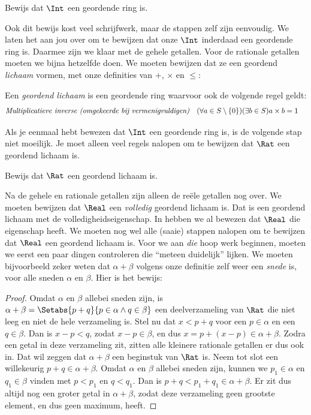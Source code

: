 \documentclass[../../../include/open-logic-section]{subfiles}
\begin{document}
\begin{prob}
Bewijs dat $\Int$ een geordende ring is. 
\end{prob}
Ook dit bewijs kost veel schrijfwerk, maar de stappen zelf zijn
eenvoudig. We laten het aan jou over om te bewijzen dat onze
$\Int$ inderdaad een geordende ring is.
Daarmee zijn we klaar met de gehele getallen. Voor de rationale getallen moeten we
bijna hetzelfde doen. We moeten bewijzen dat ze een geordend
\emph{lichaam} vormen, met onze definities van $+$, $\times$ en
$\leq$:
\begin{defn}
Een \emph{geordend lichaam} is een geordende ring waarvoor ook de volgende regel geldt:
\begin{align*}
	\emph{Multiplicatieve inverse (omgekeerde bij vermenigvuldigen)}& & (\forall a \in S \setminus \{0\})(\exists b \in S) a\times b& = 1
\end{align*}
\end{defn}
Als je eenmaal hebt bewezen dat $\Int$ een geordende ring is, is de
volgende stap niet moeilijk. Je moet alleen veel regels nalopen om
te bewijzen dat $\Rat$ een geordend lichaam is.
\begin{prob}
Bewijs dat $\Rat$ een geordend lichaam is.
\end{prob}
Na de gehele en rationale getallen zijn alleen de reële getallen nog
over. We moeten bewijzen dat $\Real$ een \emph{volledig} geordend
lichaam is. Dat is een geordend lichaam met de
volledigheidseigenschap. In  hebben we
al bewezen dat $\Real$ die eigenschap heeft. We moeten nog wel alle
(saaie) stappen nalopen om te bewijzen dat $\Real$ een geordend
lichaam is.
Voor we aan \emph{die} hoop werk beginnen, moeten we eerst een paar
dingen controleren die ``meteen duidelijk'' lijken. We moeten
bijvoorbeeld zeker weten dat $\alpha + \beta$ volgens onze definitie
zelf weer een \emph{snede} is, voor alle sneden $\alpha$ en $\beta$.
Hier is het bewijs:
\begin{proof}	
Omdat $\alpha$ en $\beta$ allebei sneden zijn, is $\alpha + \beta = \Setabs{p
+ q}{p \in \alpha \land q \in \beta}$ een deelverzameling van $\Rat$ die
niet leeg en niet de hele verzameling is. Stel nu dat $x < p + q$ voor een
$p \in \alpha$ en een $q \in \beta$. Dan is $x - p < q$, zodat $x - p
\in \beta$, en dus $x = p + (x - p) \in \alpha + \beta$. Zodra een
getal in deze verzameling zit, zitten alle kleinere rationale
getallen er dus ook in. Dat wil zeggen dat $\alpha + \beta$ een
beginstuk van $\Rat$ is. Neem tot slot een willekeurig $p + q \in
\alpha + \beta$. Omdat $\alpha$ en $\beta$ allebei sneden zijn, kunnen
we $p_1 \in \alpha$ en $q_1 \in \beta$ vinden met $p < p_1$ en $q <
q_1$. Dan is $p + q < p_1 + q_1 \in \alpha + \beta$. Er zit dus
altijd nog een groter getal in $\alpha + \beta$, zodat deze
verzameling geen grootste element, en dus geen maximum, heeft.
\end{proof}
\end{document}
